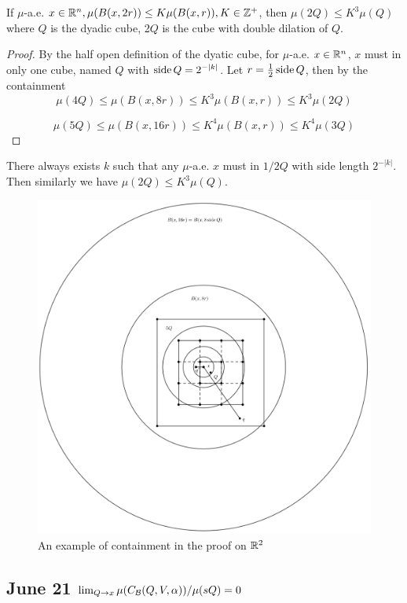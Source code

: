 \begin{lemma}
    If $\mu$-a.e. $x\in \mathbb{R}^n, \mu(B(x, 2r))\leq K\mu(B(x,r)), K\in\mathbb{Z}^+$, then
    $\mu(2Q)\leq K^3 \mu(Q)$ where $Q$ is the dyadic cube, 2$Q$ is the cube with double dilation of $Q$. 
\end{lemma}
\begin{proof} By the half open definition of the dyatic cube, for $\mu$-a.e. $x\in \mathbb{R}^n$, $x$ must in only one cube, named $Q$ with $\operatorname{side} Q = 2^{-|k|}$. Let $r = \frac{1}{2}\operatorname{side} Q$, then by the containment
    \begin{equation}
        \mu(4Q)\leq \mu(B(x, 8r))\leq K^3 \mu(B(x, r)) \leq K^3 \mu(2Q)
    \end{equation}

    \begin{equation}
        \mu(5Q) \leq \mu(B(x, 16r)) \leq K^4\mu(B(x,r))\leq K^4\mu(3Q)
    \end{equation}
\end{proof}
There always exists $k$ such that any $\mu$-a.e. $x$ must in $1/2 Q$ with side length $2^{-|k|}$. Then similarly we have $\mu(2Q)\leq K^3\mu(Q)$.

\begin{figure}[H]
    \centering
    \includegraphics[width=.66\textwidth]{images/doubleMucube.png}
    \caption{An example of containment in the proof on $\mathbb{R}^2$}
\end{figure}

\newpage
\subsection{June 21 \texorpdfstring{$\lim_{Q\rightarrow x}\mu(C_\mathcal B(Q, V, \alpha))/\mu(sQ) = 0$}{Lg}}

